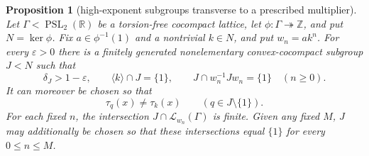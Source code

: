\documentclass[11pt,reqno]{amsart}
\newtheorem{proposition}[theorem]{Proposition}
\theoremstyle{definition}
\theoremstyle{remark}
\newcommand{\R}{\mathbb R}
\newcommand{\Z}{\mathbb Z}
\newcommand{\PSL}{\operatorname{PSL}}
\begin{document}
\begin{proposition}[high-exponent subgroups transverse to a prescribed multiplier]
\label{prop:high-exponent-transverse-subgroup}
Let \(\Gamma<\PSL_2(\R)\) be a torsion-free cocompact lattice, let
\(\phi:\Gamma\twoheadrightarrow\Z\), and put \(N=\ker\phi\).  Fix
\(a\in\phi^{-1}(1)\) and a nontrivial \(k\in N\), and put
\(w_n=ak^n\).  For every \(\varepsilon>0\) there is a finitely generated
nonelementary convex-cocompact subgroup \(J<N\) such that
\[
 \delta_J>1-\varepsilon,
 \qquad \langle k\rangle\cap J=\{1\},
 \qquad J\cap w_n^{-1}Jw_n=\{1\}
 \quad(n\ge0).
\tag{13.10ag}
\]
It can moreover be chosen so that
\[
 \tau_q(x)\ne\tau_k(x)
 \qquad(q\in J\setminus\{1\}).
\tag{13.10ah}
\]
For each fixed \(n\), the intersection
\(J\cap\mathcal L_{w_n}(\Gamma)\) is finite.  Given any fixed
\(M\), \(J\) may additionally be chosen so that these intersections equal
\(\{1\}\) for every \(0\le n\le M\).
\end{proposition}
\end{document}
